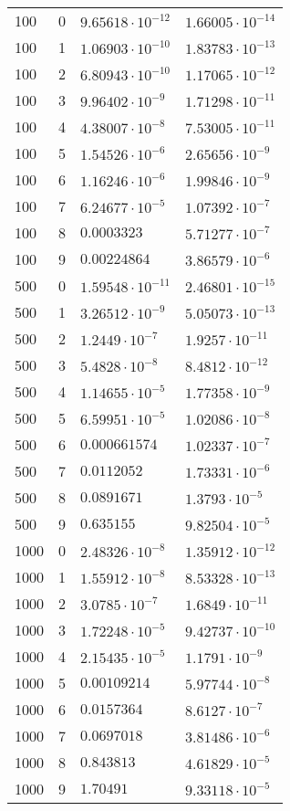\documentclass[english]{article}
\begin{document}
\begin{center}
\begin{longtable}{l|l|l|l}
    \hline
    100 & 0 & \(9.65618\cdot 10^{-12} \)& \(1.66005\cdot 10^{-14}\) \\
    100 & 1 & \(1.06903\cdot 10^{-10} \)& \(1.83783\cdot 10^{-13}\) \\
    100 & 2 & \(6.80943\cdot 10^{-10} \)& \(1.17065\cdot 10^{-12}\) \\
    100 & 3 & \(9.96402\cdot 10^{-9} \)& \(1.71298\cdot 10^{-11}\) \\
    100 & 4 & \(4.38007\cdot 10^{-8} \)& \(7.53005\cdot 10^{-11}\) \\
    100 & 5 & \(1.54526\cdot 10^{-6} \)& \(2.65656\cdot 10^{-9}\) \\
    100 & 6 & \(1.16246\cdot 10^{-6} \)& \(1.99846\cdot 10^{-9}\) \\
    100 & 7 & \(6.24677\cdot 10^{-5} \)& \(1.07392\cdot 10^{-7}\) \\
    100 & 8 & \(0.0003323   \)& \(5.71277\cdot 10^{-7}\) \\
    100 & 9 & \(0.00224864  \)& \(3.86579\cdot 10^{-6}\) \\
    \hline
    500 & 0 & \(1.59548\cdot 10^{-11} \)& \(2.46801\cdot 10^{-15}\) \\
    500 & 1 & \(3.26512\cdot 10^{-9} \)& \(5.05073\cdot 10^{-13}\) \\
    500 & 2 & \(1.2449\cdot 10^{-7}  \)& \(1.9257\cdot 10^{-11}\) \\
    500 & 3 & \(5.4828\cdot 10^{-8}  \)& \(8.4812\cdot 10^{-12}\) \\
    500 & 4 & \(1.14655\cdot 10^{-5} \)& \(1.77358\cdot 10^{-9}\) \\
    500 & 5 & \(6.59951\cdot 10^{-5} \)& \(1.02086\cdot 10^{-8}\) \\
    500 & 6 & \(0.000661574 \)& \(1.02337\cdot 10^{-7}\) \\
    500 & 7 & \(0.0112052   \)& \(1.73331\cdot 10^{-6}\) \\
    500 & 8 & \(0.0891671   \)& \(1.3793\cdot 10^{-5}\) \\
    500 & 9 & \(0.635155    \)& \(9.82504\cdot 10^{-5}\) \\
    \hline
    1000 & 0 & \(2.48326\cdot 10^{-8} \)& \(1.35912\cdot 10^{-12}\) \\
    1000 & 1 & \(1.55912\cdot 10^{-8} \)& \(8.53328\cdot 10^{-13}\) \\
    1000 & 2 & \(3.0785\cdot 10^{-7}  \)& \(1.6849\cdot 10^{-11}\) \\
    1000 & 3 & \(1.72248\cdot 10^{-5} \)& \(9.42737\cdot 10^{-10}\) \\
    1000 & 4 & \(2.15435\cdot 10^{-5} \)& \(1.1791\cdot 10^{-9}\) \\
    1000 & 5 & \(0.00109214  \)& \(5.97744\cdot 10^{-8}\) \\
    1000 & 6 & \(0.0157364   \)& \(8.6127\cdot 10^{-7}\) \\
    1000 & 7 & \(0.0697018   \)& \(3.81486\cdot 10^{-6}\) \\
    1000 & 8 & \(0.843813    \)& \(4.61829\cdot 10^{-5}\) \\
    1000 & 9 & \(1.70491     \)& \(9.33118\cdot 10^{-5}\)
  \end{longtable}
\end{center}
\end{document}
